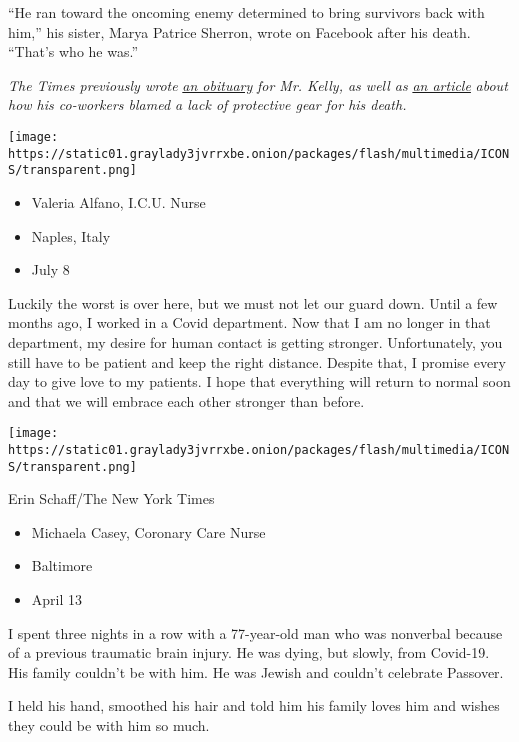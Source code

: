 ``He ran toward the oncoming enemy determined to bring survivors back
with him,'' his sister, Marya Patrice Sherron, wrote on Facebook after
his death. ``That's who he was.''

\emph{The Times previously wrote}
\emph{\href{https://www.nytimes3xbfgragh.onion/2020/03/31/obituaries/kious-kelly-dead-coronavirus.html}{an
obituary}} \emph{for Mr. Kelly, as well as}
\emph{\href{https://www.nytimes3xbfgragh.onion/2020/03/26/nyregion/nurse-dies-coronavirus-mount-sinai.html}{an
article}} \emph{about how his co-workers blamed a lack of protective
gear for his death.}

\texttt{[image: https://static01.graylady3jvrrxbe.onion/packages/flash/multimedia/ICONS/transparent.png]}

\begin{itemize}
\tightlist
\item
  Valeria Alfano, I.C.U. Nurse
\item
  Naples, Italy
\item
  July 8
\end{itemize}

Luckily the worst is over here, but we must not let our guard down.
Until a few months ago, I worked in a Covid department. Now that I am no
longer in that department, my desire for human contact is getting
stronger. Unfortunately, you still have to be patient and keep the right
distance. Despite that, I promise every day to give love to my patients.
I hope that everything will return to normal soon and that we will
embrace each other stronger than before.

\texttt{[image: https://static01.graylady3jvrrxbe.onion/packages/flash/multimedia/ICONS/transparent.png]}

Erin Schaff/The New York Times

\begin{itemize}
\tightlist
\item
  Michaela Casey, Coronary Care Nurse
\item
  Baltimore
\item
  April 13
\end{itemize}

I spent three nights in a row with a 77-year-old man who was nonverbal
because of a previous traumatic brain injury. He was dying, but slowly,
from Covid-19. His family couldn't be with him. He was Jewish and
couldn't celebrate Passover.

I held his hand, smoothed his hair and told him his family loves him and
wishes they could be with him so much.

